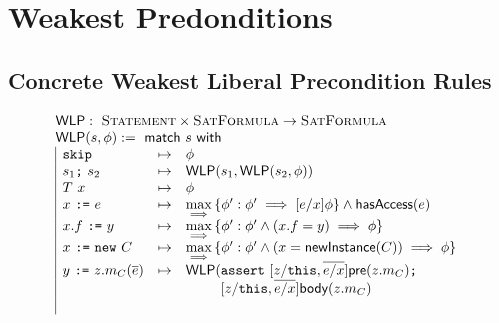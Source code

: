 \section{Weakest Predonditions}

\subsection{Concrete Weakest Liberal Precondition Rules}

\newcommand{\WLP}{\tsf{WLP}}
\newcommand{\weakest}{\max\limits_{\implies}}

\begin{spacing}{1.5}
\begin{align*}
\begin{array}{l}
\WLP : \ \tsc{Statement} \times \tsc{SatFormula} \rightarrow \tsc{SatFormula} \\
\WLP(s, \phi) := \ \tsf{match} \ s \ \tsf{with} \\
\begin{array}{|lcl}
%
\code{skip} &\mapsto&
  \phi
\\
s_1 \code{;} \ s_2 &\mapsto&
  \WLP(s_1, \WLP(s_2, \phi))
\\
T \ x &\mapsto&
  \phi
\\
x \ \code{:=} \ e &\mapsto&
  \weakest\set{ \phi\p : \phi\p \implies [e/x] \phi } \land \tsf{hasAccess}(e)
\\
x.f \ \code{:=} \ y &\mapsto&
  \weakest\set{ \phi\p : \phi\p \land (x.f = y) \implies \phi }
\\
x \ \code{:=} \ \code{new} \ C &\mapsto&
  \weakest\set{ \phi\p : \phi\p \land (x = \tsf{newInstance}(C)) \implies \phi }
\\
y \ \code{:=} \ z.m_C(\overline{e}) &\mapsto&
  \WLP(
    \code{assert} \ [ z/\code{this}, \overline{e/x} ] \tsf{pre}(z.m_C) \code{;} \\ && \hspace{2.5em}
    \text{[} z/\code{this}, \overline{e/x} \text{]} \tsf{body}(z.m_C) \\ && \hspace{2.5em}

\end{array}
\end{array}
\end{align*}
\end{spacing}
